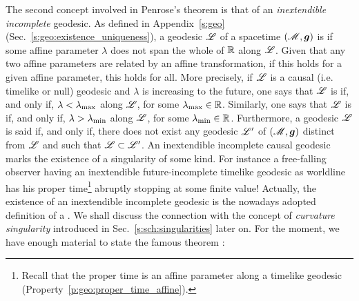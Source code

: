 The second concept involved in Penrose's theorem is that of
an \emph{inextendible incomplete} geodesic. As defined in
Appendix~\ref{s:geo} (Sec.~\ref{s:geo:existence_uniqueness}), a
geodesic $\mathscr{L}$ of a spacetime $(\mathscr{M},\bm{g})$ is  if some affine parameter $\lambda$ does not
span the whole of $\mathbb{R}$ along $\mathscr{L}$.
Given that any two affine parameters are related by
an affine transformation, if this holds for a given affine parameter, this holds for all.
More precisely, if $\mathscr{L}$ is a causal (i.e. timelike or null) geodesic and $\lambda$ is increasing to the future, one says that $\mathscr{L}$
is  if, and only if, $\lambda < \lambda_{\rm max}$
along $\mathscr{L}$, for some $\lambda_{\rm max}\in\mathbb{R}$.
Similarly, one says that $\mathscr{L}$
is  if, and only if,
$\lambda > \lambda_{\rm min}$ along $\mathscr{L}$, for some $\lambda_{\rm min}\in\mathbb{R}$.
Furthermore, a geodesic $\mathscr{L}$ is said  if, and only if,
there does not exist any geodesic $\mathscr{L}'$ of $(\mathscr{M},\bm{g})$ distinct from $\mathscr{L}$
and such that $\mathscr{L}\subset\mathscr{L}'$. An inextendible incomplete causal geodesic
marks the existence of a singularity of some kind.
For instance a free-falling observer having an
inextendible future-incomplete timelike geodesic as worldline has his proper time\footnote{Recall that
the proper time is an affine parameter along a timelike geodesic (Property~\ref{p:geo:proper_time_affine}).} abruptly
stopping at some finite value!
Actually, the existence of an inextendible incomplete geodesic is the
nowadays adopted definition of a . We shall discuss the connection with the concept of \emph{curvature singularity}
introduced in Sec.~\ref{s:sch:singularities} later on.
For the moment, we have enough material
to state the famous theorem \cite{Penro65}:


